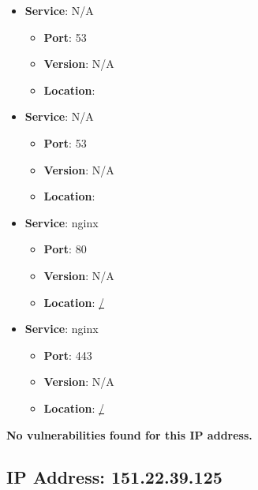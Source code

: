 \documentclass{article}
\begin{document}
\begin{itemize}
    
        \item \textbf{Service}: N/A
        \begin{itemize}
            \item \textbf{Port}: 53
            \item \textbf{Version}:  N/A 
            \item \textbf{Location}: \href{  }{  }
        \end{itemize}
    
        \item \textbf{Service}: N/A
        \begin{itemize}
            \item \textbf{Port}: 53
            \item \textbf{Version}:  N/A 
            \item \textbf{Location}: \href{  }{  }
        \end{itemize}
    
        \item \textbf{Service}: nginx
        \begin{itemize}
            \item \textbf{Port}: 80
            \item \textbf{Version}:  N/A 
            \item \textbf{Location}: \href{ / }{ / }
        \end{itemize}
    
        \item \textbf{Service}: nginx
        \begin{itemize}
            \item \textbf{Port}: 443
            \item \textbf{Version}:  N/A 
            \item \textbf{Location}: \href{ / }{ / }
        \end{itemize}
    
\end{itemize}


\textbf{No vulnerabilities found for this IP address.}




\clearpage



\subsection*{IP Address: 151.22.39.125}
\end{document}
